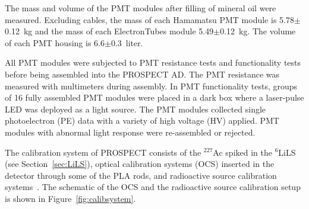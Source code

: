 The mass and volume of the PMT modules after filling of mineral oil were measured.
Excluding cables, the mass of each Hamamatsu PMT module is 5.78$\pm$0.12~kg and the mass of each ElectronTubes module 5.49$\pm$0.12~kg.
The volume of each PMT housing is 6.6$\pm$0.3~liter. 

All PMT modules were subjected to PMT resistance tests and functionality tests before being assembled into the PROSPECT AD.
The PMT resistance was measured with multimeters during assembly.
In PMT functionality tests, groups of 16 fully assembled PMT modules were placed in a dark box where a laser-pulse LED  was deployed as a light source.
The PMT modules collected single photoelectron (PE) data with a variety of high voltage (HV) applied.
PMT modules with abnormal light response were re-assembled or rejected.


The calibration system of PROSPECT consists of the $^{227}$Ac spiked in the $^6$LiLS (see Section~\ref{sec:LiLS}), optical calibration systems (OCS) inserted in the detector through some of the PLA rods, and radioactive source calibration systems~\cite{bib:prospect_calib}.
The schematic of the OCS and the radioactive source calibration setup is shown in Figure~\ref{fig:calibsystem}.

